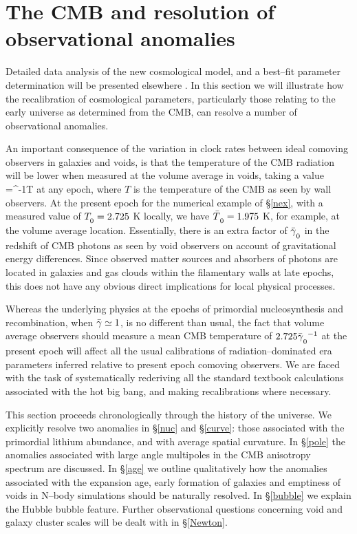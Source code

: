 \documentclass[12pt]{article}
\begin{document}
\section{The CMB and resolution of observational anomalies\label{cmb}}

Detailed data analysis of the new cosmological model, and a best--fit
parameter determination will be presented elsewhere \cite{paper2}.
In this section we will illustrate how the recalibration of cosmological
parameters, particularly those relating to the early universe as determined
from the CMB, can resolve a number of observational anomalies.

An important consequence of the variation in clock rates between ideal
comoving observers in galaxies and voids, is that the temperature of
the CMB radiation will be lower when measured at the volume average
in voids, taking a value
\beq \bT=\gb^{-1}T \label{vtemp}\eeq
at any epoch, where $T$ is the temperature
of the CMB as seen by wall observers. At the present epoch for the numerical
example of \S\ref{nex}, with a measured value of $T\Z0=2.725$ K locally, we
have $\bT\Z0=1.975$ K, for example, at the volume average location.
Essentially, there is an extra factor of $\gc$ in the redshift of CMB photons
as seen by void observers on account of gravitational energy differences.
Since observed matter sources and absorbers of photons are located in
galaxies and gas clouds within the filamentary walls at late epochs, this
does not have any obvious direct implications for local physical processes.

Whereas the underlying physics at the epochs of primordial nucleosynthesis
and recombination, when $\gb\simeq1$, is no different than usual, the fact
that volume average observers should measure a mean CMB temperature of
$2.725{\gc}^{-1}$ at the present epoch will affect all the usual
calibrations of radiation--dominated era parameters inferred relative to
present epoch comoving observers. We are faced with the task of systematically
rederiving all the standard textbook calculations \cite{Peebles,KT}
associated with the hot big bang, and making recalibrations where
necessary.

This section proceeds chronologically through the history of the universe.
We explicitly resolve two anomalies in \S\ref{nuc} and \S\ref{curve}:
those associated with the primordial lithium abundance, and with average
spatial curvature. In \S\ref{pole} the anomalies associated with large
angle multipoles in the CMB anisotropy spectrum are discussed.
In \S\ref{age} we outline qualitatively how the anomalies associated with
the expansion age, early formation of galaxies and emptiness of voids in
N--body simulations should be naturally resolved. In \S\ref{bubble} we
explain the Hubble bubble feature. Further observational
questions concerning void and galaxy cluster scales will be dealt with in
\S\ref{Newton}.
\end{document}
